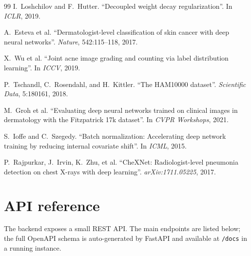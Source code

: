 \documentclass[11pt,a4paper,oneside]{report}
\begin{document}
\begin{thebibliography}{99}
I.~Loshchilov and F.~Hutter.
\newblock ``Decoupled weight decay regularization''.
\newblock In \emph{ICLR}, 2019.

A.~Esteva et al.
\newblock ``Dermatologist-level classification of skin cancer with deep neural networks''.
\newblock \emph{Nature}, 542:115--118, 2017.

X.~Wu et al.
\newblock ``Joint acne image grading and counting via label distribution learning''.
\newblock In \emph{ICCV}, 2019.

P.~Tschandl, C.~Rosendahl, and H.~Kittler.
\newblock ``The HAM10000 dataset''.
\newblock \emph{Scientific Data}, 5:180161, 2018.

M.~Groh et al.
\newblock ``Evaluating deep neural networks trained on clinical images in dermatology
with the Fitzpatrick 17k dataset''.
\newblock In \emph{CVPR Workshops}, 2021.

S.~Ioffe and C.~Szegedy.
\newblock ``Batch normalization: Accelerating deep network training by reducing internal covariate shift''.
\newblock In \emph{ICML}, 2015.

P.~Rajpurkar, J.~Irvin, K.~Zhu, et al.
\newblock ``CheXNet: Radiologist-level pneumonia detection on chest X-rays with deep learning''.
\newblock \emph{arXiv:1711.05225}, 2017.

\end{thebibliography}

\appendix

\chapter{API reference}\label{app:api}

The backend exposes a small REST API. The main endpoints are listed
below; the full OpenAPI schema is auto-generated by FastAPI and
available at \texttt{/docs} in a running instance.
\end{document}
